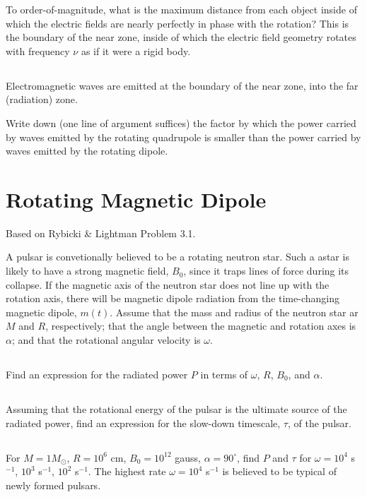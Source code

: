 \documentclass[11pt]{article}
\begin{document}
To order-of-magnitude, what is the maximum distance from each object inside of
which the electric fields are nearly perfectly in phase with the rotation?
This is the boundary of the near zone, inside of which the electric field
geometry rotates with frequency $\nu$ as if it were a rigid body.

\subsection{}
Electromagnetic waves are emitted at the boundary of the near zone, into
the far (radiation) zone.

Write down (one line of argument suffices) the factor by which the power
carried by waves emitted by the rotating quadrupole is smaller than the power
carried by waves emitted by the rotating dipole.

\section{Rotating Magnetic Dipole}

Based on Rybicki \& Lightman Problem 3.1.

A pulsar is convetionally believed to be a rotating neutron star.  Such
a astar is likely to have a strong magnetic field, $B_0$, since it traps
lines of force during its collapse.  If the magnetic axis of the neutron
star does not line up with the rotation axis, there will be magnetic dipole
radiation from the time-changing magnetic dipole, $m(t)$.  Assume that the mass
and radius of the neutron star ar $M$ and $R$, respectively; that the angle
between the magnetic and rotation axes is $\alpha$; and that the rotational
angular velocity is $\omega$.

\subsection{}
Find an expression for the radiated power $P$ in terms of $\omega$,
$R$, $B_0$, and $\alpha$.

\subsection{}
Assuming that the rotational energy of the pulsar is the ultimate source
of the radiated power, find an expression for the slow-down timescale,
$\tau$, of the pulsar.

\subsection{}
For $M=1 M_\odot$, $R=10^6$ cm, $B_0=10^{12}$ gauss, $\alpha=90^\circ$,
find $P$ and $\tau$ for $\omega=10^4$ s$^{-1}$, $10^3$ s$^{-1}$,
$10^2$ s$^{-1}$.  The highest rate $\omega=10^4$ s$^{-1}$ is believed
to be typical of newly formed pulsars.
\end{document}
